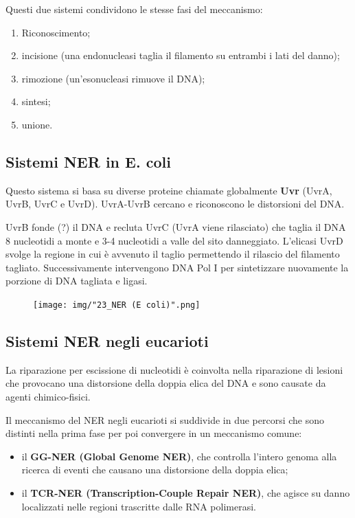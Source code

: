\documentclass[11pt]{book}
\begin{document}
Questi due sistemi condividono le stesse fasi del meccanismo:
\vspace*{-5mm}
\begin{enumerate}
\def\labelenumi{\arabic{enumi}.}
\itemsep1pt\parskip0pt
\item
  Riconoscimento;
\item
  incisione (una endonucleasi taglia il filamento su entrambi i lati del
  danno);
\item
  rimozione (un'esonucleasi rimuove il DNA);
\item
  sintesi;
\item
  unione.
\end{enumerate}

\subsection{Sistemi NER in E. coli}\label{sistemi-ner-in-e.-coli}

Questo sistema si basa su diverse proteine chiamate globalmente
\textbf{Uvr} (UvrA, UvrB, UvrC e UvrD).
UvrA-UvrB cercano e riconoscono le distorsioni del DNA.

UvrB fonde (?) il DNA e recluta UvrC (UvrA viene rilasciato) che taglia
il DNA 8 nucleotidi a monte e 3-4 nucleotidi a valle del sito
danneggiato.
L'elicasi UvrD svolge la regione in cui è avvenuto il taglio permettendo
il rilascio del filamento tagliato.
Successivamente intervengono DNA Pol I per sintetizzare nuovamente la
porzione di DNA tagliata e ligasi.

\begin{figure}[htp]
\centering
\texttt{[image: img/"23\_NER (E coli)".png]}
\caption{}
\label{ner-e-coli}
\end{figure}


\subsection{Sistemi NER negli
eucarioti}\label{sistemi-ner-negli-eucarioti}

La riparazione per escissione di nucleotidi è coinvolta nella
riparazione di lesioni che provocano una distorsione della doppia elica
del DNA e sono causate da agenti chimico-fisici.

Il meccanismo del NER negli eucarioti si suddivide in due percorsi che
sono distinti nella prima fase per poi convergere in un meccanismo
comune:

\begin{itemize}
\itemsep1pt\parskip0pt
\item
  il \textbf{GG-NER (Global Genome NER)}, che controlla l'intero genoma
  alla ricerca di eventi che causano una distorsione della doppia elica;
\item
  il \textbf{TCR-NER (Transcription-Couple Repair NER)}, che agisce su
  danno localizzati nelle regioni trascritte dalle RNA polimerasi.
\end{itemize}
\end{document}
